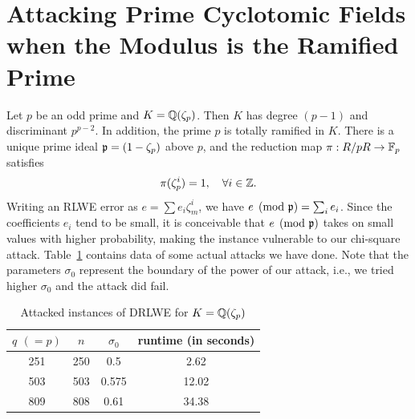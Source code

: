 \documentclass[envcountsect]{llncs}
\begin{document}
\section{Attacking Prime Cyclotomic Fields when the Modulus is the Ramified Prime}
\label{sec: ramified-prime}

Let $p$ be an odd prime and $K = \mathbb{Q}(\zeta_p)$. Then $K$ has degree $(p-1)$ and discriminant $p^{p-2}$.
In addition, the prime $p$ is totally ramified in $K$. There is a unique prime ideal $\mathfrak{p} = (1 - \zeta_p)$ above $p$, and the reduction map  $\pi: R/pR \to \mathbb{F}_p$ satisfies
\[
        \pi(\zeta_p^i) = 1, \quad \forall i \in \mathbb{Z}.
\]
Writing an RLWE error as  $e = \sum e_i \zeta_m^i$, we have $e \pmod{\mathfrak{p}} = \sum_i e_i$. Since the coefficients $e_i$ tend to be small, it is conceivable that  $e \pmod{\mathfrak{p}}$ takes on small values with higher probability, making the instance vulnerable to our chi-square attack. Table~\ref{tab: ramified} contains data of some actual attacks we have done. Note that the parameters $\sigma_0$ represent the boundary of the power of our attack, i.e., we tried higher $\sigma_0$ and the attack did fail.

\begin{table}[H]
\begin{center}
\caption{Attacked instances of DRLWE for $K= \mathbb{Q}(\zeta_p)$}
\label{tab: ramified}
\begin{tabular}{c|c|c|c}
$q$ $( = p)$ & $n$ & $\sigma_0$ & runtime (in seconds) \\
\hline
251 & 250 &  0.5 & 2.62\\
503 &  503 & 0.575 & 12.02\\
809 & 808 & 0.61 & 34.38\\
\end{tabular}
\end{center}
\end{table}











\end{document}
